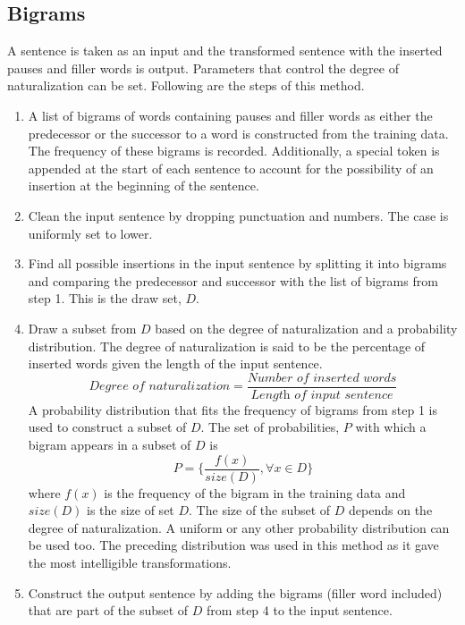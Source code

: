 \documentclass[journal]{IEEEtran}
\begin{document}
\subsection{Bigrams}

A sentence is taken as an input and the transformed sentence with the inserted pauses and filler words is output. Parameters that control the degree of naturalization can be set. Following are the steps of this method.

\begin{enumerate}
    \item A list of bigrams of words containing pauses and filler words as either the predecessor or the successor to a word is constructed from the training data. The frequency of these bigrams is recorded. Additionally, a special token is appended at the start of each sentence to account for the possibility of an insertion at the beginning of the sentence.
    \item Clean the input sentence by dropping punctuation and numbers. The case is uniformly set to lower. 
    \item Find all possible insertions in the input sentence by splitting it into bigrams and comparing the predecessor and successor with the list of bigrams from step 1. This is the draw set, $D$.
    \item Draw a subset from $D$ based on the degree of naturalization and a probability distribution. The degree of naturalization is said to be the percentage of inserted words given the length of the input sentence.
    \begin{equation}
        \textit{Degree of naturalization} = \frac{\textit{Number of inserted words}}{\textit{Length of input sentence}}
    \end{equation}
    A probability distribution that fits the frequency of bigrams from step 1 is used to construct a subset of $D$. The set of probabilities, $P$ with which a bigram appears in a subset of $D$ is 
    \begin{equation}
        P = \{\frac{f(x)}{size(D)}, \forall x \in D\}
    \end{equation}
    where $f(x)$ is the frequency of the bigram in the training data and $size(D)$ is the size of set $D$. The size of the subset of $D$ depends on the degree of naturalization.
    A uniform or any other probability distribution can be used too. The preceding distribution was used in this method as it gave the most intelligible transformations.  
    \item Construct the output sentence by adding the bigrams (filler word included) that are part of the subset of $D$ from step 4 to the input sentence.
\end{enumerate}
\end{document}
